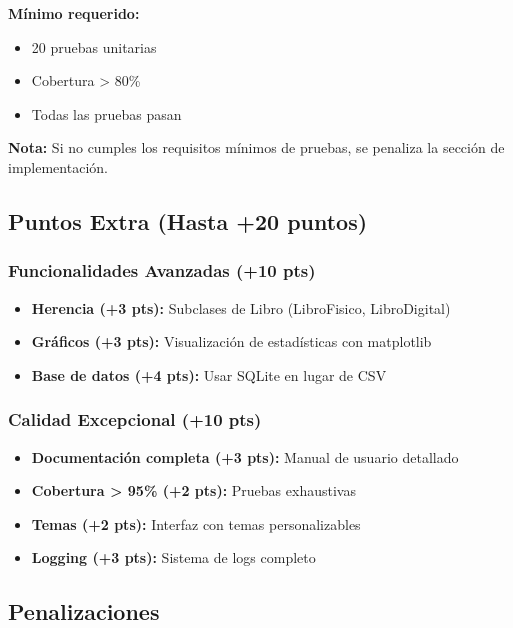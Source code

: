 \documentclass[12pt,a4paper]{article}
\begin{document}
\textbf{Mínimo requerido:}
\begin{itemize}[leftmargin=*]
    \item 20 pruebas unitarias
    \item Cobertura > 80\%
    \item Todas las pruebas pasan
\end{itemize}

\textbf{Nota:} Si no cumples los requisitos mínimos de pruebas, se penaliza la sección de implementación.

\subsection{Puntos Extra (Hasta +20 puntos)}

\subsubsection{Funcionalidades Avanzadas (+10 pts)}
\begin{itemize}[leftmargin=*]
    \item \textbf{Herencia (+3 pts):} Subclases de Libro (LibroFisico, LibroDigital)
    \item \textbf{Gráficos (+3 pts):} Visualización de estadísticas con matplotlib
    \item \textbf{Base de datos (+4 pts):} Usar SQLite en lugar de CSV
\end{itemize}

\subsubsection{Calidad Excepcional (+10 pts)}
\begin{itemize}[leftmargin=*]
    \item \textbf{Documentación completa (+3 pts):} Manual de usuario detallado
    \item \textbf{Cobertura > 95\% (+2 pts):} Pruebas exhaustivas
    \item \textbf{Temas (+2 pts):} Interfaz con temas personalizables
    \item \textbf{Logging (+3 pts):} Sistema de logs completo
\end{itemize}

\subsection{Penalizaciones}
\end{document}
